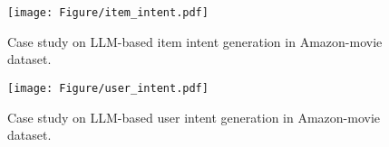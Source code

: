 \begin{figure}[h!tp]
    \centering
    \texttt{[image: Figure/item\_intent.pdf]}
    \caption{Case study on LLM-based item intent generation in Amazon-movie dataset.}
    \label{fig:item_intent}
\end{figure}

\begin{figure}[h!tp]
    \centering
    \texttt{[image: Figure/user\_intent.pdf]}
    \caption{Case study on LLM-based user intent generation in Amazon-movie dataset.} 
    \label{fig:user_intent}
\end{figure}